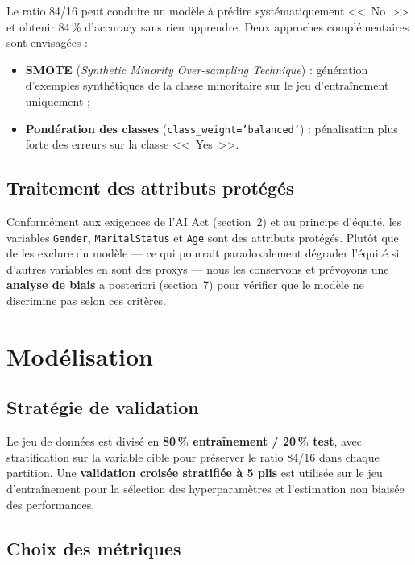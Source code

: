 Le ratio 84/16 peut conduire un modèle à prédire systématiquement <<~No~>> et obtenir 84\,\% d'accuracy sans rien apprendre. Deux approches complémentaires sont envisagées :
\begin{itemize}
    \item \textbf{SMOTE} (\textit{Synthetic Minority Over-sampling Technique}) : génération d'exemples synthétiques de la classe minoritaire sur le jeu d'entraînement uniquement ;
    \item \textbf{Pondération des classes} (\texttt{class\_weight='balanced'}) : pénalisation plus forte des erreurs sur la classe <<~Yes~>>.
\end{itemize}

\subsection{Traitement des attributs protégés}

Conformément aux exigences de l'AI Act (section~2) et au principe d'équité, les variables \texttt{Gender}, \texttt{MaritalStatus} et \texttt{Age} sont des attributs protégés. Plutôt que de les exclure du modèle --- ce qui pourrait paradoxalement dégrader l'équité si d'autres variables en sont des proxys --- nous les conservons et prévoyons une \textbf{analyse de biais} a posteriori (section~7) pour vérifier que le modèle ne discrimine pas selon ces critères.

\section{Modélisation}

\subsection{Stratégie de validation}

Le jeu de données est divisé en \textbf{80\,\% entraînement / 20\,\% test}, avec stratification sur la variable cible pour préserver le ratio 84/16 dans chaque partition. Une \textbf{validation croisée stratifiée à 5 plis} est utilisée sur le jeu d'entraînement pour la sélection des hyperparamètres et l'estimation non biaisée des performances.

\subsection{Choix des métriques}

